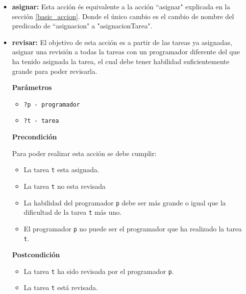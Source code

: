 \documentclass[11pt]{article}
\begin{document}
\begin{itemize}
  \item \textbf{asignar:}
  Esta acción és equivalente a la acción ``asignar" explicada en la sección \ref{basic_accion}. Donde el único cambio es el cambio de nombre del predicado de ``asignacion" a "asignacionTarea".
  \item \textbf{revisar:} El objetivo de esta acción es a partir de las tareas ya asignadas, asignar una revisión a todas la tareas con un programador diferente del que ha tenido asignada la tarea, el cual debe tener habilidad suficientemente grande para poder revisarla.
  
  \textbf{Parámetros}
  \begin{itemize}
  	\item \verb|?p - programador|
  	\item \verb|?t - tarea|
  \end{itemize}
  
  \textbf{Precondición}
  
  Para poder realizar esta acción se debe cumplir:
  \begin{itemize}
  	\item La tarea \texttt{t} esta asignada.
  	\item La tarea \texttt{t} no esta revisada
  	\item La habilidad del programador \texttt{p} debe ser más grande o igual que la dificultad de la tarea \texttt{t} más uno.
  	\item El programador \texttt{p} no puede ser el programador que ha realizado la tarea \texttt{t}.
  \end{itemize}
 
  \textbf{Postcondición}
  
  \begin{itemize}
  	\item La tarea \texttt{t} ha sido revisada por el programador \texttt{p}.
  	\item La tarea \texttt{t} está revisada.
  \end{itemize}
\end{itemize}
\end{document}
